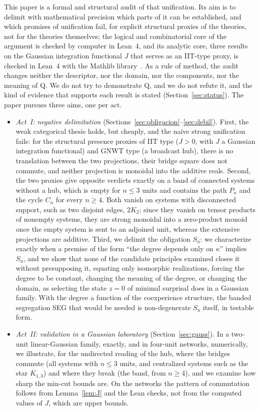 This paper is a formal and structural audit of that unification. Its aim is to delimit with mathematical precision which parts of it can be established, and which promises of unification fail, for explicit structural proxies of the theories, not for the theories themselves; the logical and combinatorial core of the argument is checked by computer in Lean~4, and its analytic core, three results on the Gaussian integration functional $J$ that serves as an IIT-type proxy, is checked in Lean~4 with the Mathlib library~\cite{Mathlib2020}. As a rule of method, the audit changes neither the descriptor, nor the domain, nor the components, nor the meaning of Q. We do not try to demonstrate Q, and we do not refute it, and the kind of evidence that supports each result is stated (Section~\ref{sec:status}). The paper pursues three aims, one per act.
\begin{itemize}
\item \emph{Act~I: negative delimitation} (Sections~\ref{sec:obligacion}--\ref{sec:debil}). First, the weak categorical thesis holds, but cheaply, and the naive strong unification fails: for the structural presence proxies of IIT type ($J>0$, with $J$ a Gaussian integration functional) and GNWT type (a broadcast hub), there is no translation between the two projections, their bridge square does not commute, and neither projection is monoidal into the additive reals. Second, the two proxies give opposite verdicts exactly on a band of connected systems without a hub, which is empty for $n\le3$ units and contains the path $P_n$ and the cycle $C_n$ for every $n\ge4$. Both vanish on systems with disconnected support, such as two disjoint edges, $2K_2$; since they vanish on tensor products of nonempty systems, they are strong monoidal into a zero-product monoid once the empty system is sent to an adjoined unit, whereas the extensive projections are additive. Third, we delimit the obligation $S_u$: we characterize exactly when a premise of the form ``the degree depends only on $\kappa$'' implies $S_u$, and we show that none of the candidate principles examined closes it without presupposing it, equating only isomorphic realizations, forcing the degree to be constant, changing the meaning of the degree, or changing the domain, as selecting the state $z=0$ of minimal surprisal does in a Gaussian family. With the degree a function of the coexperience structure, the banded segregation SEG that would be needed is non-degenerate $S_u$ itself, in testable form.
\item \emph{Act~II: validation in a Gaussian laboratory} (Section~\ref{sec:gauss}). In a two-unit linear-Gaussian family, exactly, and in four-unit networks, numerically, we illustrate, for the undirected reading of the hub, where the bridges commute (all systems with $n\le3$ units, and centralized systems such as the star $K_{1,3}$) and where they break (the band, from $n\ge4$), and we examine how sharp the min-cut bounds are. On the networks the pattern of commutation follows from Lemma~\ref{lem:J} and the Lean checks, not from the computed values of $J$, which are upper bounds.

\end{itemize}
